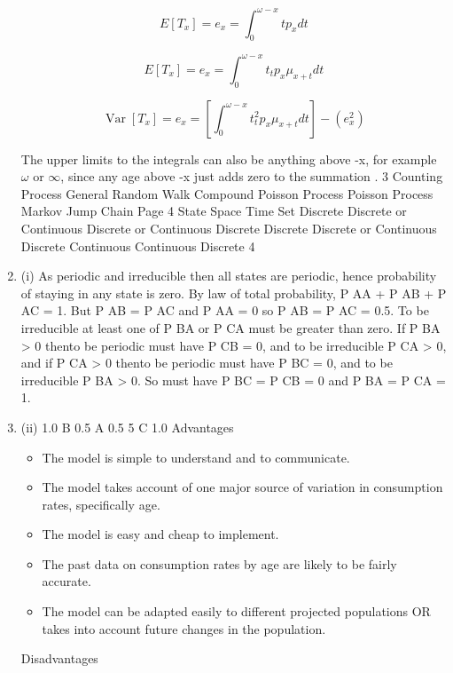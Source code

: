 \documentclass[a4paper,12pt]{article}
\begin{document}
\begin{enumerate}


\[ E[T_x]  = e_x  = \int^{\omega-x}_{0} t p_x  dt \]

\[ E[T_x]  = e_x  = \int^{\omega-x}_{0}t_t p_x \mu_{x+t} dt \]

\[ \operatorname{Var}[T_x]  = e_x  = \left[ \int^{\omega-x}_{0}t^2_t p_x \mu_{x+t} dt \right] - (e_x^2)\]


The upper limits to the integrals can also be anything above \omega-x, for example $\omega$ or $\infty$, since
any age above \omega-x just adds zero to the summation .
3
Counting Process
General Random Walk
Compound Poisson Process
Poisson Process
Markov Jump Chain
Page 4
State Space Time Set
Discrete
Discrete or Continuous
Discrete or Continuous
Discrete
Discrete Discrete or Continuous
Discrete
Continuous
Continuous
Discrete %
4
\item (i)
As periodic and irreducible then all states are periodic, hence
probability of staying in any state is zero.
By law of total probability, P AA + P AB + P AC = 1.
But P AB = P AC and P AA = 0 so P AB = P AC = 0.5.
To be irreducible at least one of P BA or P CA must be greater than zero.
If P BA > 0 thento be periodic must have P CB = 0,
and to be irreducible P CA > 0,
and if P CA > 0 thento be periodic must have P BC = 0, and to be
irreducible P BA > 0.
So must have P BC = P CB = 0 and P BA = P CA = 1.
\item (ii)
1.0
B
0.5
A
0.5
5
C
1.0
Advantages
\begin{itemize}
\item The model is simple to understand and to communicate.
\item The model takes account of one major source of variation in consumption
rates, specifically age.
\item The model is easy and cheap to implement.
\item The past data on consumption rates by age are likely to be fairly accurate.
\item The model can be adapted easily to different projected populations OR takes
into account future changes in the population.
\end{itemize}
Disadvantages
\begin{itemize}

\end{itemize}
\end{enumerate}
\end{document}
